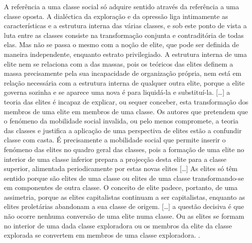 \begin{citacao}
A referência a uma classe social só adquire sentido através da referência a uma classe oposta. A dialéctica da exploração e da opressão liga intimamente as características e a estrutura interna das várias classes, e sob este ponto de vista a luta entre as classes consiste na transformação conjunta e contraditória de todas elas. Mas não se passa o mesmo com a noção de elite, que pode ser definida de maneira independente, enquanto estrato privilegiado. A estrutura interna de uma elite nem se relaciona com a das massas, pois os teóricos das elites definem a massa precisamente pela sua incapacidade de organização própria, nem está em relação necessária com a estrutura interna de qualquer outra elite, porque a elite governa sozinha e se aparece uma nova é para liquidá-la e substituí-la. [\dots] a teoria das elites é incapaz de explicar, ou sequer conceber, esta transformação dos membros de uma elite em membros de uma classe. Os autores que pretendem que o fenómeno da mobilidade social invalida, ou pelo menos compromete, a teoria das classes e justifica a aplicação de uma perspectiva de elites estão a confundir classe com casta. É precisamente a mobilidade social que permite inserir o fenómeno das elites no quadro geral das classes, pois a formação de uma elite no interior de uma classe inferior prepara a projecção desta elite para a classe superior, alimentada periodicamente por estas novas elites [\dots] As elites só têm sentido porque são elites de uma classe ou elites de uma classe transformando-se em componentes de outra classe. O conceito de elite padece, portanto, de uma assimetria, porque as elites capitalistas continuam a ser capitalistas, enquanto as elites proletárias abandonam a sua classe de origem. [\dots] a questão decisiva é que não ocorre nenhuma conversão de uma elite numa classe. Ou as elites se formam no interior de uma dada classe exploradora ou os membros da elite da classe explorada se convertem em membros de uma classe exploradora. \cite[p.~387-388]{bernardo_fascismo_2015}.
\end{citacao}

